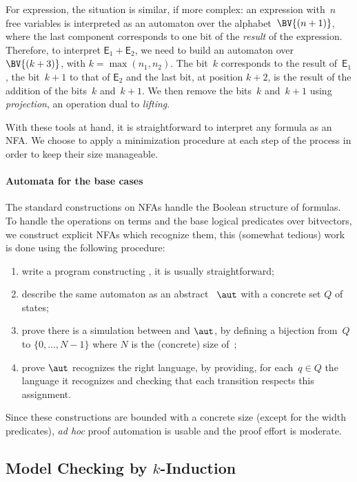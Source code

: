 For expression, the situation is similar, if more complex: an expression
with~$n$ free variables is interpreted as an automaton over the
alphabet~$\BV{(n+1)}$, where the last component corresponds to one bit of the
\emph{result} of the expression.
%
Therefore, to interpret $\mathsf E_1 + \mathsf E_2$, we need to build an
automaton over~$\BV{(k+3)}$, with $k = \max(n_1, n_2)$.
%
The bit~$k$ corresponds to the result of~$\mathsf E_1$, the bit~$k+1$ to that of
$\mathsf E_2$ and the last bit, at position $k+2$, is the result of the addition
of the bits~$k$ and~$k+1$.
%
We then remove the bits~$k$ and~$k+1$ using \emph{projection}, an operation dual
to \emph{lifting}.

With these tools at hand, it is straightforward to interpret any formula as an
NFA. We choose to apply a minimization procedure at each step of the process
in order to keep their size manageable.

\paragraph{Automata for the base cases}

The standard constructions on NFAs handle the Boolean structure of formulas.
%
To handle the operations on terms and the base logical predicates over
bitvectors, we construct explicit NFAs which recognize them, this (somewhat
tedious) work is done using the following procedure:
\begin{enumerate}
  \item write a program constructing , it is usually
    straightforward;
  \item describe the same automaton as an abstract ~$\aut$ with
    a concrete set $Q$ of states;
  \item prove there is a simulation between  and $\aut$, by
    defining a bijection from~$Q$ to $\{0, ..., N-1\}$ where $N$ is the
    (concrete) size of~;
  \item prove $\aut$ recognizes the right language, by providing, for each~$q
    \in Q$ the language it recognizes and checking that each transition respects
    this assignment.
\end{enumerate}
%
Since these constructions are bounded with a concrete size (except for the width
predicates), \emph{ad hoc} proof automation is usable and the proof effort is
moderate.

\subsection{Model Checking by \texorpdfstring{$k$}{k}-Induction}
\label{sec:swbv:kinduction}

